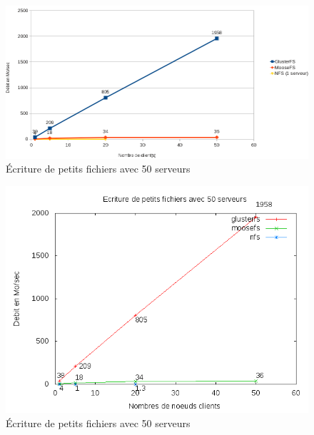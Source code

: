 \documentclass[12pt]{report}
\begin{document}
		        \begin{figure}[H]
			        \begin{center}
				        \includegraphics[width=1\linewidth]{graph/calc/50WS.png}
				        \caption{Écriture de petits fichiers avec 50 serveurs}
			        \end{center}
		        \end{figure}
\begin{figure}[H]
\begin{center}
\includegraphics[bb=0 0 640 480,width=14cm]{images/srv50ws.png}
\caption{Écriture de petits fichiers avec 50 serveurs}
\end{center}
\end{figure} 
\end{document}
